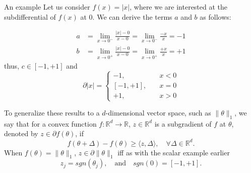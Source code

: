\documentclass[10pt,handout,english]{beamer}
\newcommand{\R}{\mathbb{R}}
\begin{document}
\begin{frame}[allowframebreaks]{An example}
Let us consider $f(x)=\lvert x\rvert$, where we are interested at the subdifferential of $f(x)$ at 0. We can derive the terms $a$ and $b$ as follows:

\begin{align*}
a&=\lim_{x\to 0^{-}}\frac{\lvert x\rvert-0}{x-0}=\lim_{x\to 0^{-}}\frac{-x}{x}=-1\\
b&=\lim_{x\to 0^{+}}\frac{\lvert x\rvert-0}{x-0}=\lim_{x\to 0^{+}}\frac{+x}{x}=+1
\end{align*}
thus, $c\in[-1,+1]$ and 
\[
\partial\lvert x \rvert=
\begin{cases}
-1,\quad &x<0\\
[-1,+1],\quad &x=0\\
+1,\quad &x> 0
\end{cases}
\]
\end{frame}
\begin{frame}[allowframebreaks]
To generalize these results to a $d$-dimensional vector space, such as $\lVert\theta\rVert_1$, we say that for a convex function $f:\R^d\to\R$, $z\in \R^d$ is a subgradient of $f$ at $\theta$, denoted by $z\in\partial f(\theta)$, if
\[
f(\theta+\Delta)-f(\theta)\geq \langle z,\Delta \rangle,\quad\forall\Delta\in\R^d.
\] 
When $f(\theta)=\lVert\theta\rVert_1$, $z\in\partial\lVert \theta\rVert_1$ iff as with the scalar example earlier
\[
z_j=sgn(\theta_j),\quad\text{and}\quad sgn(0)=[-1,+1].
\]  
\end{frame}
\end{document}
